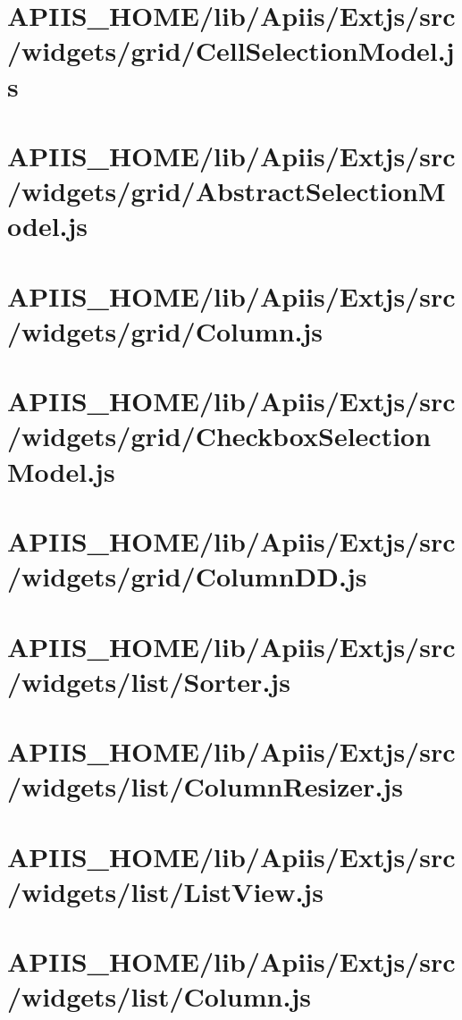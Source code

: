 \section{APIIS\_HOME/lib/Apiis/Extjs/src/widgets/grid/CellSelectionModel.js} 
\section{APIIS\_HOME/lib/Apiis/Extjs/src/widgets/grid/AbstractSelectionModel.js} 
\section{APIIS\_HOME/lib/Apiis/Extjs/src/widgets/grid/Column.js} 
\section{APIIS\_HOME/lib/Apiis/Extjs/src/widgets/grid/CheckboxSelectionModel.js} 
\section{APIIS\_HOME/lib/Apiis/Extjs/src/widgets/grid/ColumnDD.js} 
\section{APIIS\_HOME/lib/Apiis/Extjs/src/widgets/list/Sorter.js} 
\section{APIIS\_HOME/lib/Apiis/Extjs/src/widgets/list/ColumnResizer.js} 
\section{APIIS\_HOME/lib/Apiis/Extjs/src/widgets/list/ListView.js} 
\section{APIIS\_HOME/lib/Apiis/Extjs/src/widgets/list/Column.js} 

